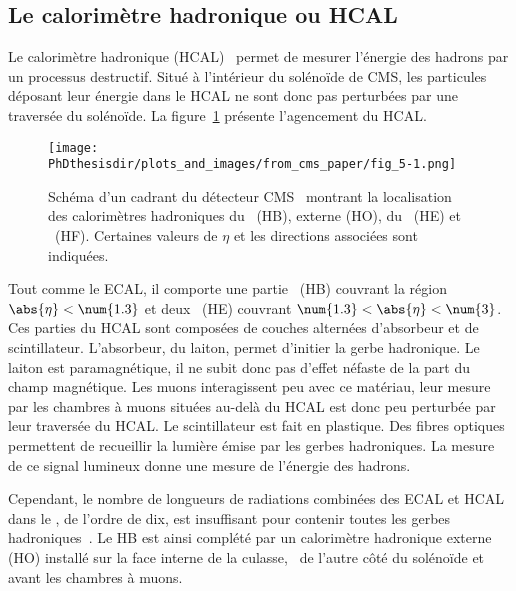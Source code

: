 \subsection{Le calorimètre hadronique ou HCAL}\label{chapter-LHC-section-CMS-subsec-HCAL}
Le calorimètre hadronique (HCAL)~\cite{cms_paper,CERN-LHCC-97-031,CMS-TDR-10} permet de mesurer l'énergie des hadrons par un processus destructif.
Situé à l'intérieur du solénoïde de CMS, les particules déposant leur énergie dans le HCAL ne sont donc pas perturbées par une traversée du solénoïde.
La figure~\ref{fig-chapter-LHC-section-CMS-subsec-HCAL-cms_paper-fig_5-1} présente l'agencement du HCAL.
\begin{figure}[h]
\centering
\texttt{[image: \\PhDthesisdir/plots\_and\_images/from\_cms\_paper/fig\_5-1.png]}
\caption[Schéma du calorimètre hadronique de CMS.]{Schéma d'un cadrant du détecteur CMS~\cite{cms_paper} montrant la localisation des calorimètres hadroniques du \CMSbarrel\ (HB), externe (HO), du \CMSendcap\ (HE) et \CMSforward\ (HF). Certaines valeurs de $\eta$ et les directions associées sont indiquées.}
\label{fig-chapter-LHC-section-CMS-subsec-HCAL-cms_paper-fig_5-1}
\end{figure}
\par Tout comme le ECAL, il comporte une partie \CMSbarrel\ (HB) couvrant la région $\abs{\eta}<\num{1.3}$ et deux \CMSendcaps\ (HE) couvrant $\num{1.3}<\abs{\eta}<\num{3}$.
Ces parties du HCAL sont composées de couches alternées d'absorbeur et de scintillateur.
L'absorbeur, du laiton, permet d'initier la gerbe hadronique.
Le laiton est paramagnétique, il ne subit donc pas d'effet néfaste de la part du champ magnétique.
Les muons interagissent peu avec ce matériau, leur mesure par les chambres à muons situées au-delà du HCAL est donc peu perturbée par leur traversée du HCAL.
Le scintillateur est fait en plastique.
Des fibres optiques permettent de recueillir la lumière émise par les gerbes hadroniques.
La mesure de ce signal lumineux donne une mesure de l'énergie des hadrons.
\par Cependant, le nombre de longueurs de radiations combinées des ECAL et HCAL dans le \CMSbarrel, de l'ordre de dix, est insuffisant pour contenir toutes les gerbes hadroniques~\cite{cms_paper}.
Le HB est ainsi complété par un calorimètre hadronique externe (HO) installé sur la face interne de la culasse, \ie\ de l'autre côté du solénoïde et avant les chambres à muons.
